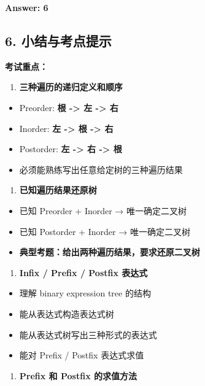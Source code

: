 \documentclass[10pt,a4paper,openany]{ctexbook}
\theoremstyle{definition}
\theoremstyle{remark}
\begin{document}
\textbf{Answer: 6}
\vspace{-2pt}

\subsection{6. 小结与考点提示}

\textbf{考试重点：}
\begin{enumerate}
\item \textbf{三种遍历的递归定义和顺序}
\end{enumerate}

\begin{itemize}
\item Preorder: \textbf{根 -> 左 -> 右}
\item Inorder: \textbf{左 -> 根 -> 右}
\item Postorder: \textbf{左 -> 右 -> 根}
\item 必须能熟练写出任意给定树的三种遍历结果

\end{itemize}

\begin{enumerate}
\item \textbf{已知遍历结果还原树}
\end{enumerate}

\begin{itemize}
\item 已知 Preorder + Inorder → 唯一确定二叉树
\item 已知 Postorder + Inorder → 唯一确定二叉树
\item \textbf{典型考题：给出两种遍历结果，要求还原二叉树}

\end{itemize}

\begin{enumerate}
\item \textbf{Infix / Prefix / Postfix 表达式}
\end{enumerate}

\begin{itemize}
\item 理解 binary expression tree 的结构
\item 能从表达式构造表达式树
\item 能从表达式树写出三种形式的表达式
\item 能对 Prefix / Postfix 表达式求值

\end{itemize}

\begin{enumerate}
\item \textbf{Prefix 和 Postfix 的求值方法}
\end{enumerate}
\end{document}
